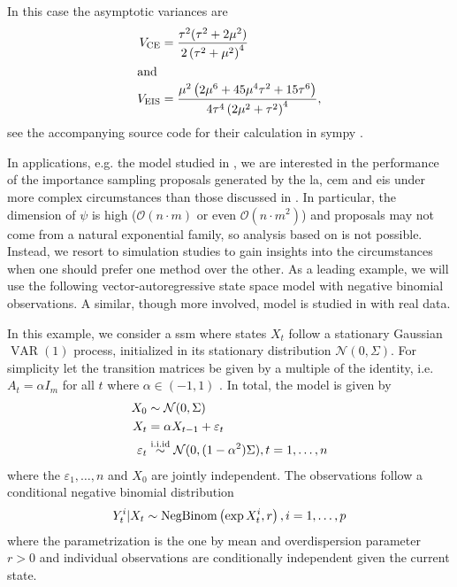 \begin{example}
    In this case the asymptotic variances are
    \begin{align*}
        V_{{\text{CE}}} &= \frac{\tau^{2}(\tau^{2} + 2\mu^{2})}{2 \left( \tau^{2} + \mu^{2} \right)^{4}}\\
        \intertext{and}
        V_{{\text{EIS}}} &= \frac{\mu^{2} \left(2 \mu^{6} + 45 \mu^{4} \tau^{2} + 15 \tau^{6}\right)}{4 \tau^{4} \left(2 \mu^{2} + \tau^{2}\right)^{4}},
    \end{align*}
    see the accompanying source code for their calculation in sympy .
\end{example}


In applications, e.g. the model studied in , we are interested in the performance of the importance sampling proposals generated by the \gls{la}, \gls{cem} and \gls{eis} under more complex circumstances than those discussed in . In particular, the dimension of $\psi$ is high ($\mathcal O(n \cdot m)$ or even $\mathcal O(n \cdot m^{2})$) and proposals may not come from a natural exponential family, so analysis based on  is not possible. Instead, we resort to simulation studies to gain insights into the circumstances when one should prefer one method over the other.
As a leading example, we will use the following vector-autoregressive state space model with negative binomial observations. A similar, though more involved, model is studied in  with real data.

\begin{example}
    \label{ex:negbinom-ar1}
    In this example, we consider a \gls{ssm} where states $X_{t}$ follow a stationary Gaussian $\operatorname{VAR}(1)$ process, initialized in its stationary distribution $\mathcal N(0,\Sigma)$. For simplicity let the transition matrices be given by a multiple of the identity, i.e. $A_{t} = \alpha I_{m}$ for all $t$ where $\alpha \in (-1, 1)$ . 
    In total, the model is given by
    \begin{align*}
    X_{0} &\sim \mathcal N(0,\Sigma) \\
    X_{t} &= \alpha X_{t - 1} + \varepsilon_{t}\\
    \varepsilon_t &\stackrel{\text{i.i.id}}{\sim} \mathcal N(0, (1 - \alpha^{2})\Sigma), t = 1, \dots, n
    \end{align*}
    where the $\varepsilon_{1}, \dots, n$ and $X_{0}$ are jointly independent. The observations follow a conditional negative binomial distribution 
    $$
    Y^{i}_{t} | X_{t} \sim \operatorname{NegBinom} \left( \exp{X^{i}_{t}}, r \right), i = 1, \dots, p
    $$
    where the parametrization is the one by mean and overdispersion parameter $r > 0$  and individual observations are conditionally independent given the current state.
\end{example}

